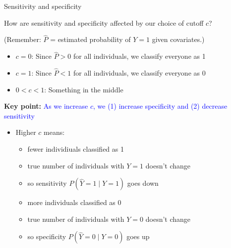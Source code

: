 \documentclass[10pt,t]{beamer}
\begin{document}
\begin{frame}{Sensitivity and specificity}
	
	\vspace{-7 mm}
	
	How are sensitivity and specificity affected by our choice of cutoff $c$?   
	\smallskip
	
	(Remember: $\hat{P}$ = estimated probability of $Y = 1$ given covariates.)
	
	\medskip
	
	\begin{itemize}
		\item $c = 0$: Since $\hat{P} > 0$ for all individuals, we classify everyone as 1 
		
		\smallskip
		
		\item $c = 1$: Since $\hat{P} < 1$ for all individuals, we classify everyone as 0 
		
		\smallskip
		
		\item $0 < c < 1$: Something in the middle  
	\end{itemize}

	\medskip

	\textbf{Key point:} \textcolor{blue}{As we increase $c$, we (1) increase specificity and (2) decrease sensitivity}  
	
	\medskip
	\begin{itemize}
		\item Higher $c$ means:  
		\smallskip
		
		\begin{itemize}
			\item fewer individiuals classified as 1 
			\item true number of individuals with $Y = 1$ doesn't change
			\item so sensitivity $P(\hat{Y}= 1 \mid Y = 1)$ goes down  
			
			\medskip
			\item more individuals classified as 0 
			\item true number of individuals with $Y = 0$ doesn't change
			\item so specificity $P(\hat{Y}= 0 \mid Y = 0)$ goes up
		\end{itemize}
	\end{itemize}
\end{frame}
\end{document}
